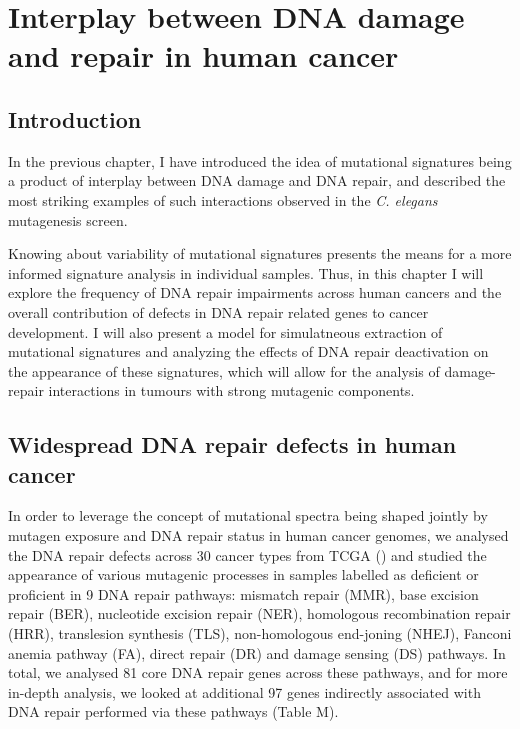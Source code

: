 


\pagestyle{empty}
\chapter{Interplay between DNA damage and repair in human cancer}

\section{Introduction}

In the previous chapter, I have introduced the idea of mutational signatures being a product 
of interplay between DNA damage and DNA repair, and described the most striking examples of 
such interactions observed in the \textit{C. elegans} mutagenesis screen.

Knowing about variability of mutational signatures presents the means for a more informed 
signature analysis in individual samples. Thus, in this chapter I will explore the frequency 
of DNA repair impairments across human cancers and the overall contribution of defects in DNA 
repair related genes to cancer development. I will also present a model for simulatneous 
extraction of mutational signatures and analyzing the effects of DNA repair deactivation 
on the appearance of these signatures, which will allow for the analysis of damage-repair 
interactions in tumours with strong mutagenic components.


\section{Widespread DNA repair defects in human cancer}

In order to leverage the concept of mutational spectra being shaped jointly by mutagen exposure 
and DNA repair status in human cancer genomes, we analysed the DNA repair defects across 30 cancer 
types from TCGA (\cite{TCGA}) and studied the appearance of various mutagenic processes in samples 
labelled as deficient or proficient in 9 DNA repair pathways: mismatch repair (MMR), 
base excision repair (BER), nucleotide excision repair (NER), homologous recombination repair (HRR), 
translesion synthesis (TLS), non-homologous end-joning (NHEJ), Fanconi anemia pathway (FA), direct 
repair (DR) and damage sensing (DS) pathways. In total, we analysed 81 core DNA repair genes 
across these pathways, and for more in-depth analysis, we looked at additional 97 genes 
indirectly associated with DNA repair performed via these pathways (Table M).

